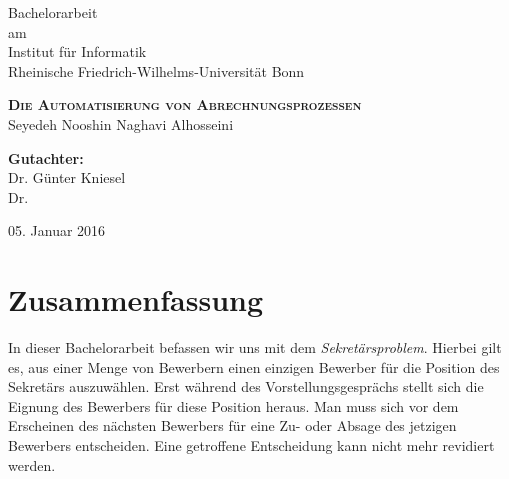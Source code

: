 \documentclass[12pt,twoside]{report}
\begin{document}
	\begin{titlepage}
		\begin{center}
			 
			 {\Large Bachelorarbeit}\\
			 \vspace{0.5cm}
			 {\normalsize am}\\
			 \vspace{0.5cm}
			 {\Large Institut für Informatik}\\
			 \vspace{0.2cm}
			 {\Large Rheinische Friedrich-Wilhelms-Universität Bonn}
			 
			
			\vspace{3cm}
			
			\textbf{\Huge \scshape Die Automatisierung von Abrechnungsprozessen}\\
			\vspace{0.5cm}
			{\Large{Seyedeh Nooshin Naghavi Alhosseini}}
			
			\vspace{3cm}
			\Large{\textbf{Gutachter:}}\\
			\Large{Dr. Günter Kniesel}\\
			\Large{Dr. }
			\vspace{3cm}
			
			
			05. Januar 2016
			
		\end{center}
		
	\end{titlepage}
	\pagestyle{empty}
	\clearpage\mbox{}\clearpage
	\chapter*{Zusammenfassung}
	
		In dieser Bachelorarbeit befassen wir uns mit dem \textit{Sekretärsproblem}. Hierbei gilt es, aus einer Menge von Bewerbern einen einzigen Bewerber für die Position des Sekretärs auszuwählen. Erst während des Vorstellungsgesprächs stellt sich die Eignung des Bewerbers für diese Position heraus. Man muss sich vor dem Erscheinen des nächsten Bewerbers für eine Zu- oder Absage des jetzigen Bewerbers entscheiden. Eine getroffene Entscheidung kann nicht mehr revidiert werden.\\ 
		
\end{document}
